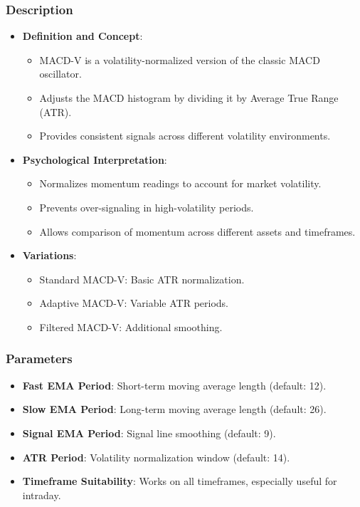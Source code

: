 \documentclass[12pt]{article}
\begin{document}
\subsubsection{Description}
\begin{itemize}
\item \textbf{Definition and Concept}:
  \begin{itemize}
  \item MACD-V is a volatility-normalized version of the classic MACD oscillator.
  \item Adjusts the MACD histogram by dividing it by Average True Range (ATR).
  \item Provides consistent signals across different volatility environments.
  \end{itemize}
\item \textbf{Psychological Interpretation}:
  \begin{itemize}
  \item Normalizes momentum readings to account for market volatility.
  \item Prevents over-signaling in high-volatility periods.
  \item Allows comparison of momentum across different assets and timeframes.
  \end{itemize}
\item \textbf{Variations}:
  \begin{itemize}
  \item Standard MACD-V: Basic ATR normalization.
  \item Adaptive MACD-V: Variable ATR periods.
  \item Filtered MACD-V: Additional smoothing.
  \end{itemize}
\end{itemize}

\subsubsection{Parameters}
\begin{itemize}
\item \textbf{Fast EMA Period}: Short-term moving average length (default: 12).
\item \textbf{Slow EMA Period}: Long-term moving average length (default: 26).
\item \textbf{Signal EMA Period}: Signal line smoothing (default: 9).
\item \textbf{ATR Period}: Volatility normalization window (default: 14).
\item \textbf{Timeframe Suitability}: Works on all timeframes, especially useful for intraday.
\end{itemize}
\end{document}
